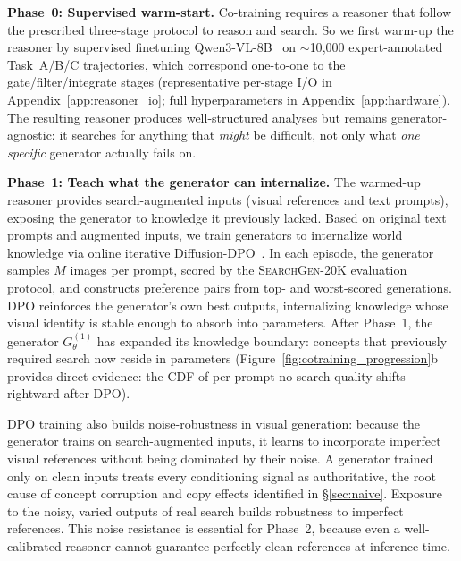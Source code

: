 \documentclass{article}
\newcommand{\dataset}{\textsc{SearchGen-20K}}
\begin{document}
\textbf{Phase~0: Supervised warm-start.}
Co-training requires a reasoner that follow the prescribed three-stage protocol to reason and search.
So we first warm-up the reasoner by supervised finetuning Qwen3-VL-8B~\cite{qwen2024vl} on ${\sim}$10{,}000 expert-annotated Task~A/B/C trajectories, which correspond one-to-one to the gate/filter/integrate stages (representative per-stage I/O in Appendix~\ref{app:reasoner_io}; full hyperparameters in Appendix~\ref{app:hardware}).
The resulting reasoner produces well-structured analyses but remains generator-agnostic: it searches for anything that \emph{might} be difficult, not only what \emph{one specific} generator actually fails on.

\textbf{Phase~1: Teach what the generator can internalize.}
The warmed-up reasoner provides search-augmented inputs (visual references and text prompts), exposing the generator to knowledge it previously lacked.
Based on original text prompts and augmented inputs, we train generators to internalize world knowledge via online iterative Diffusion-DPO~\cite{rafailov2023dpo,wallace2024diffusiondpo}. In each episode, the generator samples $M$ images per prompt, scored by the \dataset{} evaluation protocol, and constructs preference pairs from top- and worst-scored generations.
DPO reinforces the generator's own best outputs, internalizing knowledge whose visual identity is stable enough to absorb into parameters.
After Phase~1, the generator $G_\theta^{(1)}$ has expanded its knowledge boundary: concepts that previously required search now reside in parameters (Figure~\ref{fig:cotraining_progression}b provides direct evidence: the CDF of per-prompt no-search quality shifts rightward after DPO).

DPO training also builds noise-robustness in visual generation: because the generator trains on search-augmented inputs, it learns to incorporate imperfect visual references without being dominated by their noise. A generator trained only on clean inputs treats every conditioning signal as authoritative, the root cause of concept corruption and copy effects identified in \S\ref{sec:naive}. Exposure to the noisy, varied outputs of real search builds robustness to imperfect references. This noise resistance is essential for Phase~2, because even a well-calibrated reasoner cannot guarantee perfectly clean references at inference time.
\end{document}
